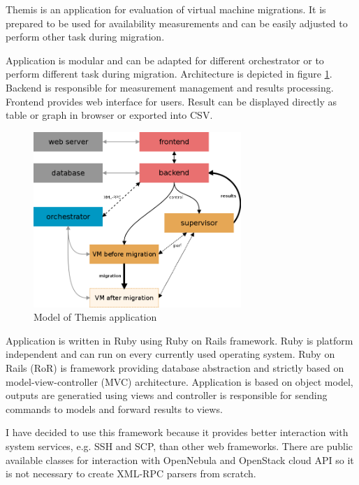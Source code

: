 
Themis is an application for evaluation of virtual machine migrations. It is prepared to be used for availability measurements and can be easily adjusted to perform other task during migration. 

Application is modular and can be adapted for different orchestrator or to perform different task during migration. Architecture is depicted in figure \ref{img:themis-model}. Backend is responsible for measurement management and results processing. Frontend provides web interface for users. Result can be displayed directly as table or graph in browser or exported into \Ac{CSV}.

\begin{figure}[htb]
	\begin{center}
	\includegraphics[width=0.7\textwidth]{themis-model.png}
	\end{center}
	\caption{Model of Themis application}
	\label{img:themis-model}

\end{figure}

Application is written in Ruby using Ruby on Rails framework. Ruby is platform independent and can run on every currently used operating system. Ruby on Rails (\Ac{RoR}) is framework providing database abstraction and strictly based on model-view-controller (\Ac{MVC}) architecture. Application is based on object model, outputs are generatied using views and controller is responsible for sending commands to models and forward results to views.

I have decided to use this framework because it provides better interaction with system services, e.g. \Ac{SSH} and \Ac{SCP}, than other web frameworks. There are public available classes for interaction with OpenNebula and OpenStack cloud \Ac{API} so it is not necessary to create \mbox{\Ac{XML}-\Ac{RPC}} parsers from scratch.

